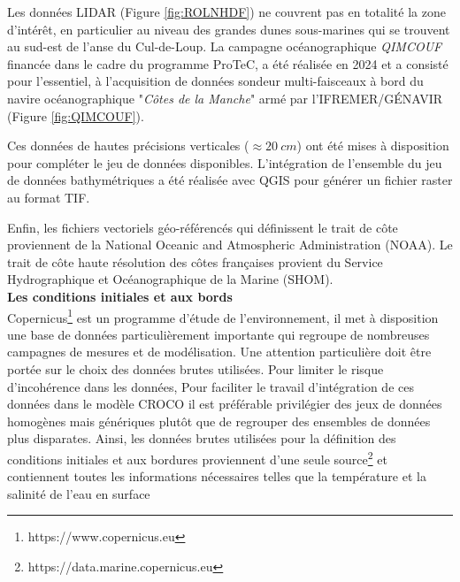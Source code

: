 \documentclass[10pt,a4paper,titlepage]{article}
\begin{document}
Les données LIDAR (Figure \ref{fig:ROLNHDF}) ne couvrent pas en totalité la zone d'intérêt, en particulier au niveau des grandes dunes sous-marines qui se trouvent au sud-est de l'anse du Cul-de-Loup. La campagne océanographique \textit{QIMCOUF} financée dans le cadre du programme ProTeC, a été réalisée en 2024 et a consisté pour l'essentiel, à l'acquisition de données sondeur multi-faisceaux à bord du navire océanographique "\textit{Côtes de la Manche}" armé par l'IFREMER/GÉNAVIR (Figure \ref{fig:QIMCOUF}).


Ces données de hautes précisions verticales ($\approx 20~cm$) ont été mises à disposition pour compléter le jeu de données disponibles.
L'intégration de l'ensemble du jeu de données bathymétriques a été réalisée avec QGIS pour générer un fichier raster au format TIF.


Enfin, les fichiers vectoriels géo-référencés qui définissent le trait de côte proviennent de la National Oceanic and Atmospheric Administration (NOAA). Le trait de côte haute résolution des côtes françaises provient du Service Hydrographique et Océanographique de la Marine (SHOM).\\



\textbf{Les conditions initiales et aux bords}\\
Copernicus\footnote{https://www.copernicus.eu} est un programme d'étude de l'environnement, il met à disposition une base de données particulièrement importante qui regroupe de nombreuses campagnes de mesures et de modélisation.
Une attention particulière doit être portée sur le choix des données brutes utilisées.
Pour limiter le risque d'incohérence dans les données, 
Pour faciliter le travail d'intégration de ces données dans le modèle CROCO il est préférable privilégier des jeux de données homogènes mais génériques plutôt que de regrouper des ensembles de données plus disparates.
Ainsi, les données brutes utilisées pour la définition des conditions initiales et aux bordures proviennent d'une seule source\footnote{https://data.marine.copernicus.eu} et contiennent toutes les informations nécessaires telles que la température et la salinité de l'eau en surface \parencite{copernicus_marine_data}
\end{document}
